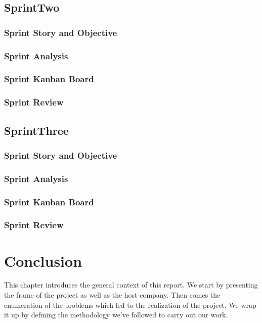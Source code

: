 \subsection{SprintTwo}
\subsubsection{Sprint Story and Objective}
\subsubsection{Sprint Analysis}
\subsubsection{Sprint Kanban Board}
\subsubsection{Sprint Review}

\subsection{SprintThree}
\subsubsection{Sprint Story and Objective}
\subsubsection{Sprint Analysis}
\subsubsection{Sprint Kanban Board}
\subsubsection{Sprint Review}

\setcounter{secnumdepth}{0} %
\section{Conclusion}
This chapter introduces the general context of this report. We start by presenting the frame of the project as well as the host company. Then comes the enumeration of the problems which led to the realization of the project. We wrap it up by defining the methodology we’ve followed to carry out our work. \citep{test1}
